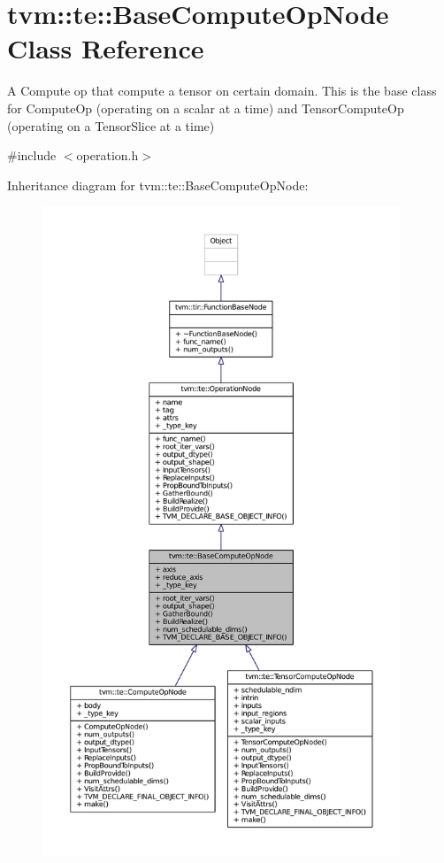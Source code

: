 \hypertarget{classtvm_1_1te_1_1BaseComputeOpNode}{}\section{tvm\+:\+:te\+:\+:Base\+Compute\+Op\+Node Class Reference}
\label{classtvm_1_1te_1_1BaseComputeOpNode}


A Compute op that compute a tensor on certain domain. This is the base class for Compute\+Op (operating on a scalar at a time) and Tensor\+Compute\+Op (operating on a Tensor\+Slice at a time)  




{\ttfamily \#include $<$operation.\+h$>$}



Inheritance diagram for tvm\+:\+:te\+:\+:Base\+Compute\+Op\+Node\+:
\nopagebreak
\begin{figure}[H]
\begin{center}
\leavevmode
\includegraphics[height=550pt]{classtvm_1_1te_1_1BaseComputeOpNode__inherit__graph}
\end{center}
\end{figure}


